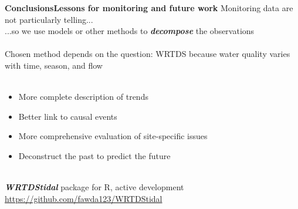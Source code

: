\documentclass[serif]{beamer}\usepackage[]{graphicx}\usepackage[]{color}
\newcommand{\emtxt}[1]{\textbf{\textit{#1}}}
\begin{document}
\begin{frame}{\textbf{Conclusions}}{\textbf{Lessons for monitoring and future work}}
\onslide<+->
Monitoring data are not particularly telling... \\
...so we use models or other methods to \emtxt{decompose} the observations \\~\\
\onslide<+->
Chosen method depends on the question: WRTDS because water quality varies with time, season, and flow \\~\\
\onslide<+->
\begin{itemize}
\item More complete description of trends
\item Better link to causal events
\item More comprehensive evaluation of site-specific issues
\item Deconstruct the past to predict the future\\~\\
\end{itemize}
\onslide<+->
\emtxt{WRTDStidal} package for R, active development
\href{https://github.com/fawda123/WRTDStidal}{\url{https://github.com/fawda123/WRTDStidal}}
\end{frame}



\end{document}
